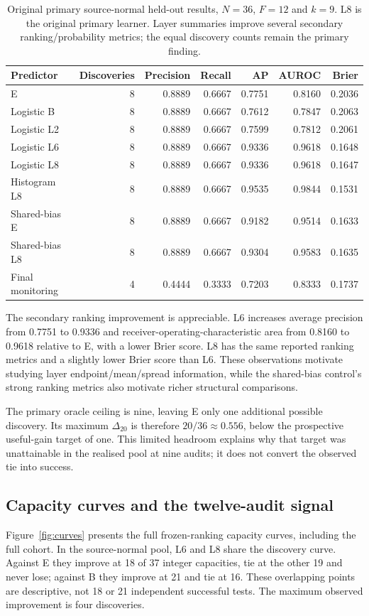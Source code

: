 \documentclass[nolineno]{ieeeaccess}
\newcommand{\Dtwenty}{\Delta_{20}}
\begin{document}
\begin{table}[t]
\caption{Original primary source-normal held-out results, $N=36$, $F=12$ and $k=9$. L8 is the original primary learner. Layer summaries improve several secondary ranking/probability metrics; the equal discovery counts remain the primary finding.}
\label{tab:primary}
\centering\small
\begin{tabular}{lrrrrrr}
\toprule Predictor & Discoveries & Precision & Recall & AP & AUROC & Brier\\\midrule
E &8&0.8889&0.6667&0.7751&0.8160&0.2036\\
Logistic B &8&0.8889&0.6667&0.7612&0.7847&0.2063\\
Logistic L2 &8&0.8889&0.6667&0.7599&0.7812&0.2061\\
Logistic L6 &8&0.8889&0.6667&0.9336&0.9618&0.1648\\
Logistic L8 &8&0.8889&0.6667&0.9336&0.9618&0.1647\\
Histogram L8 &8&0.8889&0.6667&0.9535&0.9844&0.1531\\
Shared-bias E &8&0.8889&0.6667&0.9182&0.9514&0.1633\\
Shared-bias L8 &8&0.8889&0.6667&0.9304&0.9583&0.1635\\
Final monitoring &4&0.4444&0.3333&0.7203&0.8333&0.1737\\\bottomrule
\end{tabular}
\end{table}

The secondary ranking improvement is appreciable. L6 increases average precision from 0.7751 to 0.9336 and receiver-operating-characteristic area from 0.8160 to 0.9618 relative to E, with a lower Brier score. L8 has the same reported ranking metrics and a slightly lower Brier score than L6. These observations motivate studying layer endpoint/mean/spread information, while the shared-bias control's strong ranking metrics also motivate richer structural comparisons.

The primary oracle ceiling is nine, leaving E only one additional possible discovery. Its maximum $\Dtwenty$ is therefore $20/36\approx0.556$, below the prospective useful-gain target of one. This limited headroom explains why that target was unattainable in the realised pool at nine audits; it does not convert the observed tie into success.

\subsection{Capacity curves and the twelve-audit signal}
Figure~\ref{fig:curves} presents the full frozen-ranking capacity curves, including the full cohort. In the source-normal pool, L6 and L8 share the discovery curve. Against E they improve at 18 of 37 integer capacities, tie at the other 19 and never lose; against B they improve at 21 and tie at 16. These overlapping points are descriptive, not 18 or 21 independent successful tests. The maximum observed improvement is four discoveries.
\end{document}
